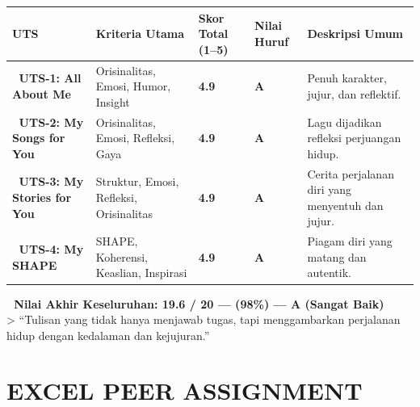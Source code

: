 \documentclass[
  letterpaper,
  DIV=11,
  numbers=noendperiod]{scrreprt}
\begin{document}
\begin{longtable}[]{@{}
  >{\raggedright\arraybackslash}p{}
  >{\raggedright\arraybackslash}p{}
  >{\raggedright\arraybackslash}p{}
  >{\raggedright\arraybackslash}p{}
  >{\raggedright\arraybackslash}p{}@{}}
\toprule\noalign{}
\begin{minipage}[b]{\linewidth}\raggedright
\textbf{UTS}
\end{minipage} & \begin{minipage}[b]{\linewidth}\raggedright
\textbf{Kriteria Utama}
\end{minipage} & \begin{minipage}[b]{\linewidth}\raggedright
\textbf{Skor Total (1--5)}
\end{minipage} & \begin{minipage}[b]{\linewidth}\raggedright
\textbf{Nilai Huruf}
\end{minipage} & \begin{minipage}[b]{\linewidth}\raggedright
\textbf{Deskripsi Umum}
\end{minipage} \\
\midrule\noalign{}
\endhead
\bottomrule\noalign{}
\endlastfoot
🧩 \textbf{UTS-1: All About Me} & Orisinalitas, Emosi, Humor, Insight &
\textbf{4.9} & \textbf{A} & Penuh karakter, jujur, dan reflektif. \\
🎵 \textbf{UTS-2: My Songs for You} & Orisinalitas, Emosi, Refleksi,
Gaya & \textbf{4.9} & \textbf{A} & Lagu dijadikan refleksi perjuangan
hidup. \\
📖 \textbf{UTS-3: My Stories for You} & Struktur, Emosi, Refleksi,
Orisinalitas & \textbf{4.9} & \textbf{A} & Cerita perjalanan diri yang
menyentuh dan jujur. \\
🧠 \textbf{UTS-4: My SHAPE} & SHAPE, Koherensi, Keaslian, Inspirasi &
\textbf{4.9} & \textbf{A} & Piagam diri yang matang dan autentik. \\
\end{longtable}

\textbf{💯 Nilai Akhir Keseluruhan: 19.6 / 20 --- (98\%) --- A (Sangat
Baik)}\\
\textgreater{} ``Tulisan yang tidak hanya menjawab tugas, tapi
menggambarkan perjalanan hidup dengan kedalaman dan kejujuran.''

\section{EXCEL PEER ASSIGNMENT}\label{excel-peer-assignment}
\end{document}
